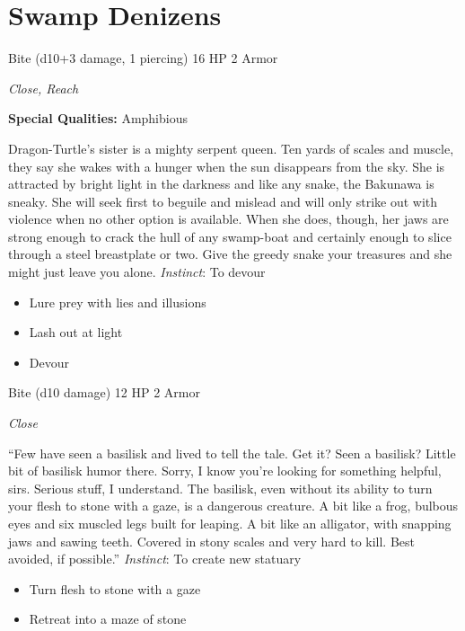 \section{Swamp Denizens}
\HRule
{}

Bite (d10+3 damage, 1 piercing)\hspace*{\fill} 16 HP 2 Armor

\emph{Close, Reach}

\textbf{Special Qualities:}
Amphibious

\HRule
Dragon-Turtle's sister is a mighty serpent queen. Ten yards of scales and muscle, they say she wakes with a hunger when the sun disappears from the sky. She is attracted by bright light in the darkness and like any snake, the Bakunawa is sneaky. She will seek first to beguile and mislead and will only strike out with violence when no other option is available. When she does, though, her jaws are strong enough to crack the hull of any swamp-boat and certainly enough to slice through a steel breastplate or two. Give the greedy snake your treasures and she might just leave you alone. \emph{Instinct}: To devour
\begin{itemize}
\item Lure prey with lies and illusions
\item Lash out at light
\item Devour
\end{itemize}

\HRule
{}

Bite (d10 damage)\hspace*{\fill} 12 HP 2 Armor

\emph{Close}

\HRule
``Few have seen a basilisk and lived to tell the tale. Get it? Seen a basilisk? Little bit of basilisk humor there. Sorry, I know you're looking for something helpful, sirs. Serious stuff, I understand. The basilisk, even without its ability to turn your flesh to stone with a gaze, is a dangerous creature. A bit like a frog, bulbous eyes and six muscled legs built for leaping. A bit like an alligator, with snapping jaws and sawing teeth. Covered in stony scales and very hard to kill. Best avoided, if possible.'' \emph{Instinct}: To create new statuary
\begin{itemize}
\item Turn flesh to stone with a gaze
\item Retreat into a maze of stone
\end{itemize}

